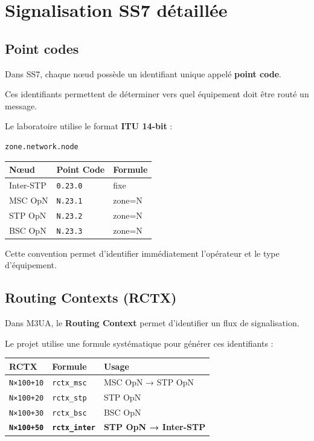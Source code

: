 \documentclass[
]{article}
\begin{document}
\section{Signalisation SS7
détaillée}\label{signalisation-ss7-duxe9tailluxe9e}

\subsection{Point codes}\label{point-codes}

Dans SS7, chaque nœud possède un identifiant unique appelé \textbf{point
code}.

Ces identifiants permettent de déterminer vers quel équipement doit être
routé un message.

Le laboratoire utilise le format \textbf{ITU 14-bit} :

\begin{verbatim}
zone.network.node
\end{verbatim}

\begin{longtable}[]{@{}lll@{}}
\toprule\noalign{}
Nœud & Point Code & Formule \\
\midrule\noalign{}
\endhead
\bottomrule\noalign{}
\endlastfoot
Inter-STP & \texttt{0.23.0} & fixe \\
MSC OpN & \texttt{N.23.1} & zone=N \\
STP OpN & \texttt{N.23.2} & zone=N \\
BSC OpN & \texttt{N.23.3} & zone=N \\
\end{longtable}

Cette convention permet d'identifier immédiatement l'opérateur et le
type d'équipement.

\subsection{Routing Contexts (RCTX)}\label{routing-contexts-rctx}

Dans M3UA, le \textbf{Routing Context} permet d'identifier un flux de
signalisation.

Le projet utilise une formule systématique pour générer ces identifiants
:

\begin{longtable}[]{@{}lll@{}}
\toprule\noalign{}
RCTX & Formule & Usage \\
\midrule\noalign{}
\endhead
\bottomrule\noalign{}
\endlastfoot
\texttt{N×100+10} & \texttt{rctx\_msc} & MSC OpN → STP OpN \\
\texttt{N×100+20} & \texttt{rctx\_stp} & STP OpN \\
\texttt{N×100+30} & \texttt{rctx\_bsc} & BSC OpN \\
\textbf{\texttt{N×100+50}} & \textbf{\texttt{rctx\_inter}} & \textbf{STP
OpN → Inter-STP} \\
\end{longtable}
\end{document}
